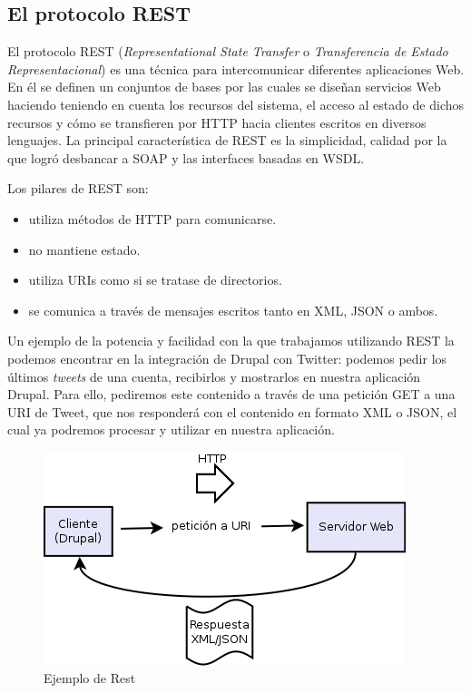 \subsection{El protocolo REST}
El protocolo REST (\textit{Representational State Transfer} o \textit{Transferencia de Estado Representacional}) 
es una técnica para intercomunicar diferentes aplicaciones Web. En él se definen un conjuntos de bases por las cuales
se diseñan servicios Web haciendo teniendo en cuenta los recursos del sistema, el acceso al estado de dichos 
recursos y cómo se transfieren por HTTP hacia clientes escritos en diversos lenguajes. La principal 
característica de REST es la simplicidad, calidad por la que logró desbancar a SOAP y las interfaces basadas 
en WSDL.

Los pilares de REST son:

\begin{itemize}
  \item utiliza métodos de HTTP para comunicarse.
  \item no mantiene estado.
  \item utiliza URIs como si se tratase de directorios.
  \item se comunica a través de mensajes escritos tanto en XML, JSON o ambos.
\end{itemize}

Un ejemplo de la potencia y facilidad con la que trabajamos utilizando REST la podemos encontrar en la integración 
de Drupal con Twitter: podemos pedir los últimos \textit{tweets} de una cuenta, recibirlos y mostrarlos en 
nuestra aplicación Drupal. Para ello, pediremos este contenido a través de una petición GET a una URI 
de Tweet, que nos responderá con el contenido en formato XML o JSON, el cual ya podremos procesar y 
utilizar en nuestra aplicación. 
 
\begin{figure}
  \centering
    \includegraphics{Assets/Introduccion/Imagenes/diagrama_servicios_web.png}
  \caption{Ejemplo de Rest}
\end{figure}

